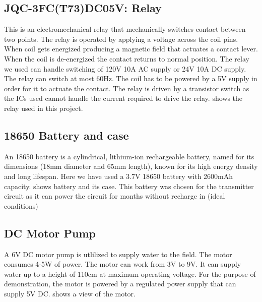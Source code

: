 \subsection{JQC-3FC(T73)DC05V: Relay}


This is an electromechanical relay that mechanically switches contact between two points. The relay is operated by applying a voltage across the coil pins. When coil gets energized producing a magnetic field that actuates a contact lever. When the coil is de-energized the contact returns to normal position. The relay we used can handle switching of 120V 10A AC supply or 24V 10A DC supply. The relay can switch at most 60Hz. The coil has to be powered by a 5V supply in order for it to actuate the contact\cite{jqc}. The relay is driven by a transistor switch as the ICs used cannot handle the current required to drive the relay.  shows the relay used in this project.


\subsection{18650 Battery and case}

An 18650 battery is a cylindrical, lithium-ion rechargeable battery, named for its dimensions (18mm diameter and 65mm length), known for its high energy density and long lifespan. Here we have used a 3.7V 18650 battery with 2600mAh capacity.  shows battery and its case. This battery was chosen for the transmitter circuit as it can power the circuit for months without recharge in (ideal conditions)
\vspace*{10pt}

\subsection{DC Motor Pump}

A 6V DC motor pump is utlilized to supply water to the field. The motor consumes 4-5W of power. The motor can work from 3V to 9V. It can supply water up to a height of 110cm at maximum operating voltage.\cite{pump} For the purpose of demonstration, the motor is powered by a regulated power supply that can supply 5V DC.  shows a view of the motor.\\

